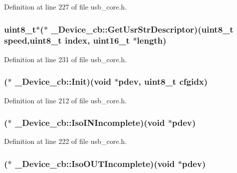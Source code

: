Definition at line 227 of file usb\-\_\-core.\-h.

\hypertarget{struct___device__cb_a5809d0b352a170d39c3ec15fa9070d15}{
\subsubsection[{Get\-Usr\-Str\-Descriptor}]{ {\bf uint8\-\_\-t}$\ast$($\ast$ \-\_\-\-Device\-\_\-cb\-::\-Get\-Usr\-Str\-Descriptor)({\bf uint8\-\_\-t} speed,{\bf uint8\-\_\-t} index, {\bf uint16\-\_\-t} $\ast${\bf length})}}\label{struct___device__cb_a5809d0b352a170d39c3ec15fa9070d15}


Definition at line 231 of file usb\-\_\-core.\-h.

\hypertarget{struct___device__cb_a32d5bd2c14d36adaeee879efb2d99937}{
\subsubsection[{Init}]{($\ast$ \-\_\-\-Device\-\_\-cb\-::\-Init)({\bf void} $\ast$pdev, {\bf uint8\-\_\-t} cfgidx)}}\label{struct___device__cb_a32d5bd2c14d36adaeee879efb2d99937}


Definition at line 212 of file usb\-\_\-core.\-h.

\hypertarget{struct___device__cb_a0edbe34c35d5d64485f293448aa8cae6}{
\subsubsection[{Iso\-I\-N\-Incomplete}]{($\ast$ \-\_\-\-Device\-\_\-cb\-::\-Iso\-I\-N\-Incomplete)({\bf void} $\ast$pdev)}}\label{struct___device__cb_a0edbe34c35d5d64485f293448aa8cae6}


Definition at line 222 of file usb\-\_\-core.\-h.

\hypertarget{struct___device__cb_aa3104ec3940cc254286c6f93ee23b632}{
\subsubsection[{Iso\-O\-U\-T\-Incomplete}]{($\ast$ \-\_\-\-Device\-\_\-cb\-::\-Iso\-O\-U\-T\-Incomplete)({\bf void} $\ast$pdev)}}\label{struct___device__cb_aa3104ec3940cc254286c6f93ee23b632}



